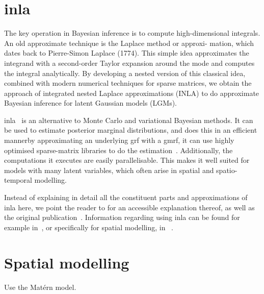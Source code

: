 \documentclass[british]{scrreprt}
\begin{document}
\section{\texorpdfstring{\Acrlong{inla}}{INLA}}
\label{sec:inla}
\begin{displayquote}
    The key operation in Bayesian inference is to compute high-dimensional integrals. An old approximate technique is the Laplace method or approxi- mation, which dates back to Pierre-Simon Laplace (1774). This simple idea approximates the integrand with a second-order Taylor expansion around the mode and computes the integral analytically. By developing a nested version of this classical idea, combined with modern numerical techniques for sparse matrices, we obtain the approach of integrated nested Laplace approximations (INLA) to do approximate Bayesian inference for latent Gaussian models (LGMs).
\end{displayquote}

\Acrfull{inla}~\cite{RueApproximateBayesianinference2009} is an alternative to Monte Carlo and variational Bayesian methods. It can be used to estimate posterior marginal distributions, and does this in an efficient manner\textemdash{}by approximating an underlying \gls{grf} with a \gls{gmrf}, it can use highly optimised sparse-matrix libraries to do the estimation~\cite{Gaedke-MerzhauserParallelizedintegratednested2022}. Additionally, the computations it executes are easily parallelisable. This makes it well suited for models with many latent variables, which often arise in spatial and spatio-temporal modelling.

Instead of explaining in detail all the constituent parts and approximations of \gls{inla} here, we point the reader to \cite{RueBayesianComputingINLA2017} for an accessible explanation thereof, as well as the original publication~\cite{RueApproximateBayesianinference2009}. Information regarding using \gls{inla} can be found for example in~\cite{Gomez-RubioBayesianinferenceINLA2020}, or specifically for spatial modelling, in ~\cite{KrainskiAdvancedSpatialModeling2019}.

\section{Spatial modelling}
\label{sec:spatial-modelling}
\begin{displayquote}
    Use the Matérn model.
\end{displayquote}
\end{document}
